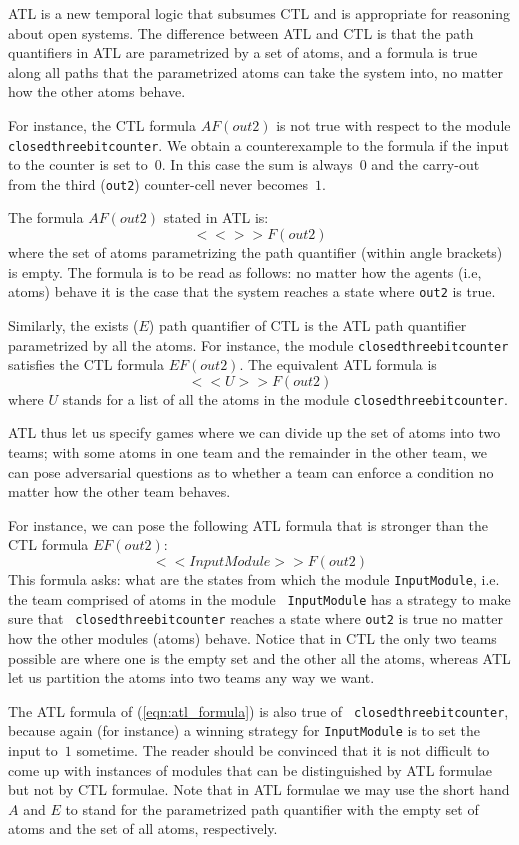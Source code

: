 ATL is a new temporal logic that subsumes CTL and is appropriate for
reasoning about open systems. The difference between ATL and CTL is
that the path quantifiers in ATL are parametrized by a set of atoms,
and a formula is true along all paths that the parametrized atoms can
take the system into, no matter how the other atoms behave. 

For instance, the CTL formula $A F (out2)$ is not true with respect to
the module {\tt closedthreebitcounter}.
We obtain a counterexample to the formula if the input to the counter is set to~$0$.
In this case the sum is always~$0$ and the carry-out from the third ({\tt out2})
counter-cell never becomes~$1$.

The formula $A F (out2)$ stated in ATL is: $$<< >> F (out2) $$ where the set
of atoms parametrizing the path quantifier (within angle brackets) is
empty. The formula is to be read as follows: no matter how the agents
(i.e, atoms) behave it is the case that the system reaches a state
where {\tt out2} is true.

Similarly, the exists ($E$) path quantifier of CTL is the ATL path
quantifier parametrized by all the atoms. For instance, the module
{\tt closedthreebitcounter} satisfies the CTL formula $E F (out2)$.
The equivalent ATL formula is $$<< U >> F (out2)$$ where $U$
stands for a list of all the atoms in the module {\tt closedthreebitcounter}. 

ATL thus let us specify games where we can divide up the set of
atoms into two teams; with some atoms in one team and the remainder in the
other team, we can pose adversarial questions as to whether a team
can enforce a condition no matter how the other team behaves.

For instance, we can pose the following ATL formula that is stronger than the CTL formula $E F
(out2)$:
\begin{equation}
\label{eqn:atl_formula}
 << InputModule >> F (out2) 
\end{equation}
This formula asks: what are the states from which the module
{\tt InputModule}, i.e. the team comprised of atoms in the module {\tt
InputModule} has a strategy to make sure that {\tt
closedthreebitcounter} reaches  a state where {\tt out2} is true no
matter how the other modules (atoms) behave. Notice that in CTL the
only two teams possible are where one is the empty set and the other
all the atoms, whereas ATL let us partition the atoms into two teams
any way we want. 

The ATL formula of (\ref{eqn:atl_formula}) is also true of {\tt
closedthreebitcounter}, because again (for instance) a winning strategy
for {\tt InputModule} is to set the input to~$1$ sometime.
The reader should be convinced that it is not
difficult to come up with instances of modules that can be
distinguished by ATL formulae but not by CTL formulae. 
Note that in ATL formulae we may use the short hand $A$ and $E$ to stand for
the parametrized path quantifier with the empty set of atoms and the set of all atoms, respectively.

